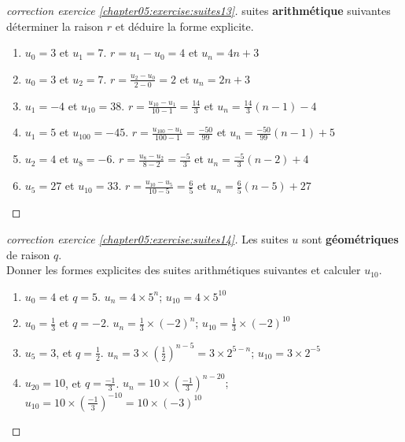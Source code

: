 \documentclass[main.tex]{subfiles}
\begin{document}
\vspace{-0.5em} 
\begin{proof}[correction exercice \ref{chapter05:exercise:suites13}]   suites \textbf{arithmétique} suivantes déterminer la raison $r$ et déduire la forme explicite.
	\begin{enumerate}[label=\arabic*),leftmargin=*]
		\item $u_0=3$ et $u_{1}=7$.   \colorbox{BurntOrange}{$r=u_{1}-u_{0}=4$ et $u_n=4n+3$}
		\item $u_0=3$ et $u_{2}=7$.   \colorbox{BurntOrange}{$r=\frac{u_{2}-u_{0}}{2-0}=2$ et $u_n=2n+3$}
		\item $u_1=-4$ et $u_{10}=38$.  \colorbox{BurntOrange}{$r=\frac{u_{10}-u_{1}}{10-1}=\frac{14}{3}$ et $u_n=\frac{14}{3}(n-1)-4$}
		\item $u_1=5$ et $u_{100}=-45$. \colorbox{BurntOrange}{$r=\frac{u_{100}-u_{1}}{100-1}=\frac{-50}{99}$ et $u_n=\frac{-50}{99}(n-1)+5$}
		\item $u_2=4$ et $u_8=-6$.  \colorbox{BurntOrange}{$r=\frac{u_{8}-u_{2}}{8-2}=\frac{-5}{3}$ et $u_n=\frac{-5}{3}(n-2)+4$}
		\item $u_5=27$ et $u_{10}=33$.  \colorbox{BurntOrange}{$r=\frac{u_{10}-u_{5}}{10-5}=\frac{6}{5}$ et $u_n=\frac{6}{5}(n-5)+27$} 
	\end{enumerate}
\end{proof}
\vspace{-0.5em}
\begin{proof}[correction exercice \ref{chapter05:exercise:suites14}]        Les suites $u$ sont \textbf{géométriques} de raison $q$. \\
	Donner les formes explicites des suites arithmétiques suivantes et calculer $u_{10}$.
	\vspace{-0.5em}
		\begin{enumerate}[label=\arabic*),leftmargin=*]
			\item $u_0=4$ et $q=5$.   \colorbox{BurntOrange}{$u_n=4\times 5^{n}$; $u_{10}=4\times 5^{10}$}
			\item $u_0=\frac{1}{3}$ et $q=-2$.  \colorbox{BurntOrange}{$u_n=\frac{1}{3}\times (-2)^{n}$; $u_{10}=\frac{1}{3}\times (-2)^{10}$}
			\item $u_5=\num{3}$, et $q=\frac{1}{2}$.  \colorbox{BurntOrange}{$u_n=3\times \left(\frac{1}{2}\right)^{n-5}=3\times 2^{5-n}$; $u_{10}=3\times 2^{-5}$}
			\item $u_{20}=\num{10}$, et $q=\frac{-1}{3}$.  \colorbox{BurntOrange}{$u_n=10\times \left(\frac{-1}{3}\right)^{n-20}$; $u_{10}=10\times \left(\frac{-1}{3}\right)^{-10}=10\times (-3)^{10}$}
		\end{enumerate}
\end{proof}
\end{document}
